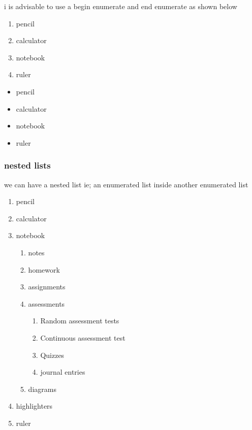 \documentclass[a4paper,12pt]{article}
\begin{document}
  	 i is advisable to use a begin enumerate and end enumerate as shown below
  	 
  	 \begin{enumerate}
  	 	\item pencil
  	 	\item calculator
  	 	\item notebook
  	 	\item ruler
  	 	\end{enumerate}
  	 \begin{itemize}
  	 	\item pencil
  	 	\item calculator 
  	 	\item notebook
  	 	\item ruler
  	 \end{itemize}
  	 
  	 
  	 \subsubsection{nested lists}
  we can have a nested list ie; an enumerated list inside another enumerated list	 
  	 \begin{enumerate}
  	 	\item pencil
  	 	\item calculator
  	 	\item notebook
  	 	\begin{enumerate}
  	 		\item notes
  	 		\item homework
  	 		\item assignments
  	 		\item assessments
  	 		\begin{enumerate}
  	 			\item Random assessment tests
  	 			\item Continuous assessment test
  	 			\item Quizzes
  	 			\item journal entries
  	 			
  	 			
  	 		\end{enumerate}
  	 		\item diagrams
  	 	\end{enumerate}
  	 	\item highlighters
  	 	\item ruler
  	 \end{enumerate}
  	 
\end{document}
